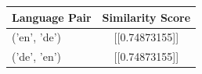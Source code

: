 \begin{tabular}{|l|c|}
\hline
Language Pair & Similarity Score \\
\hline
('en', 'de') & [[0.74873155]] \\
('de', 'en') & [[0.74873155]] \\
\hline
\end{tabular}

